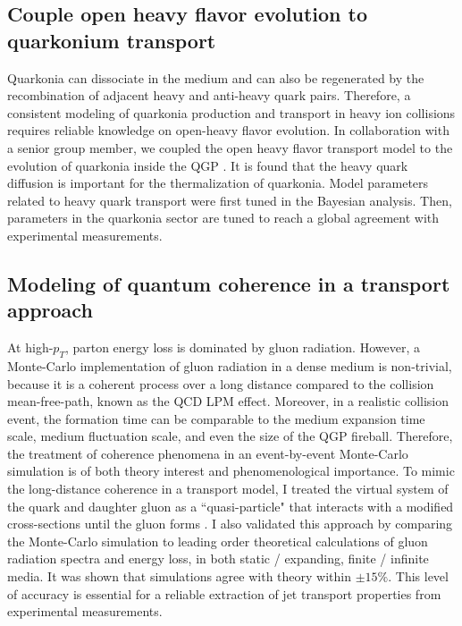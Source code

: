 \documentclass[12pt,a4paper]{revtex4-1}
\begin{document}
\subsection*{Couple open heavy flavor evolution to quarkonium transport}
Quarkonia can dissociate in the medium and can also be regenerated by the recombination of adjacent heavy and anti-heavy quark pairs. 
Therefore, a consistent modeling of quarkonia production and transport in heavy ion collisions requires reliable knowledge on open-heavy flavor evolution.
In collaboration with a senior group member, we coupled the open heavy flavor transport model to the evolution of quarkonia inside the QGP \cite{Yao:2018zrg}.
It is found that the heavy quark diffusion is important for the thermalization of quarkonia.
Model parameters related to heavy quark transport were first tuned in the Bayesian analysis.
Then, parameters in the quarkonia sector are tuned to reach a global agreement with experimental measurements.

\subsection*{Modeling of quantum coherence in a transport approach}
At high-$p_T$, parton energy loss is dominated by gluon radiation. 
However, a Monte-Carlo implementation of gluon radiation in a dense medium is non-trivial, because it is a coherent process over a long distance  compared to the collision mean-free-path, known as the QCD LPM effect. 
Moreover, in a realistic collision event, the formation time can be comparable to the medium expansion time scale, medium fluctuation scale, and even the size of the QGP fireball. 
Therefore, the treatment of coherence phenomena in an event-by-event Monte-Carlo simulation is of both theory interest and phenomenological importance.
To mimic the long-distance coherence in a transport model, I treated the virtual system of the quark and daughter gluon as a ``quasi-particle" that interacts with a modified cross-sections until the gluon forms \cite{Ke:2018jem}. 
I also validated this approach by comparing the Monte-Carlo simulation to leading order theoretical calculations of gluon radiation spectra and energy loss, in both static / expanding, finite / infinite media. 
It was shown that simulations agree with theory within $\pm 15\%$. 
This level of accuracy is essential for a reliable extraction of jet transport properties from experimental measurements.



\end{document}
